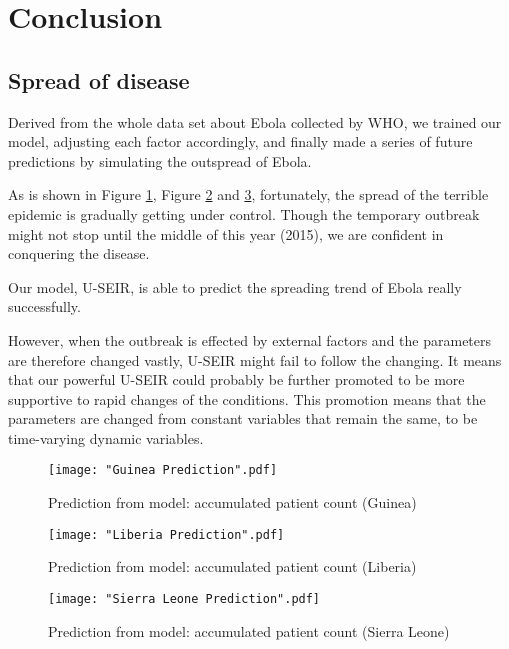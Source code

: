 \documentclass[12pt]{article}
\begin{document}
\section{Conclusion}

\subsection{Spread of disease}

Derived from the whole data set about Ebola collected by WHO, we trained our model, adjusting each factor accordingly, and finally made a series of future predictions by simulating the outspread of Ebola.

As is shown in Figure \ref{GuineaPrediction}, Figure \ref{LiberiaPrediction} and \ref{SierraLeonePrediction}, fortunately, the spread of the terrible epidemic is gradually getting under control. Though the temporary outbreak might not stop until the middle of this year (2015), we are confident in conquering the disease.

Our model, U-SEIR, is able to predict the spreading trend of Ebola really successfully.

However, when the outbreak is effected by external factors and the parameters are therefore changed vastly, U-SEIR might fail to follow the changing. It means that our powerful U-SEIR could probably be further promoted to be more supportive to rapid changes of the conditions. This promotion means that the parameters are changed from constant variables that remain the same, to be time-varying dynamic variables. 


\begin{figure}[htbp]
\centerline{\texttt{[image: "Guinea Prediction".pdf]}}
\caption{Prediction from model: accumulated patient count (Guinea)}
\label{GuineaPrediction}
\end{figure}

\begin{figure}[htbp]
\centerline{\texttt{[image: "Liberia Prediction".pdf]}}
\caption{Prediction from model: accumulated patient count (Liberia)}
\label{LiberiaPrediction}
\end{figure}

\begin{figure}[htbp]
\centerline{\texttt{[image: "Sierra Leone Prediction".pdf]}}
\caption{Prediction from model: accumulated patient count (Sierra Leone)}
\label{SierraLeonePrediction}
\end{figure}
\end{document}
